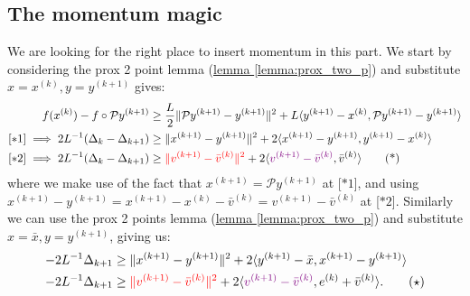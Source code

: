 \documentclass[]{article}
\theoremstyle{definition}
\begin{document}
    \subsection{The momentum magic}
        We are looking for the right place to insert momentum in this part. We start by considering the prox 2 point lemma (\hyperref[lemma:prox_two_p]{lemma \ref*{lemma:prox_two_p}}) and substitute $x = x^{(k)}, y = y^{(k + 1)}$ gives: 
        \begin{align*}
            f(x^{(k)}) - f\circ \mathcal Py^{(k + 1)}
            &\ge 
            \frac{L}{2}\Vert \mathcal Py^{(k + 1)} - y^{(k + 1)}\Vert^2 + 
            L \langle y^{(k + 1)} - x^{(k)}, \mathcal P y^{(k + 1)} - y^{(k + 1)}\rangle 
            \\
            [*1]\implies
            2L^{-1} (\Delta_k - \Delta_{k + 1}) 
            &\ge 
            \Vert x^{(k + 1)} - y^{(k + 1)}\Vert^2 + 
            2 \langle x^{(k + 1)} - y^{(k + 1)}, y^{(k + 1)} - x^{(k)}\rangle
            \\
            [*2]\implies
            2L^{-1} (\Delta_k - \Delta_{k + 1})  
            & \ge 
            \textcolor{red}
            {
                \Vert 
                    v^{(k + 1)} - \bar v^{(k)}
                \Vert^2
            }
             + 
            2\langle \textcolor{violet}{v^{(k + 1)} - \bar v^{(k)}}, \bar v^{(k)}\rangle
            \tag{*}
        \end{align*}
        where we make use of the fact that $x^{(k + 1)} = \mathcal P y^{(k + 1)}$ at [$*1$], and using $x^{(k + 1)} - y^{(k + 1)} = x^{(k + 1)} - x^{(k)} - \bar v^{(k)} = v^{(k + 1)} - \bar v^{(k)}$ at [$*2$]. Similarly we can use the prox 2 points lemma (\hyperref[lemma:prox_two_p]{lemma \ref*{lemma:prox_two_p}}) and substitute $x = \bar x, y = y^{(k + 1)}$, giving us: 
        \begin{align*}
            -2L^{-1}\Delta_{k + 1} 
            &\ge 
            \Vert x^{(k + 1)} - y^{(k + 1)}\Vert^2 + 2
            \langle y^{(k + 1)} - \bar x, x^{(k + 1)} - y^{(k + 1)}\rangle
            \\
            -2L^{-1}\Delta_{k + 1} 
            & \ge 
            \textcolor{red}
            {
                \Vert 
                    v^{(k + 1)} - \bar v^{(k)}
                \Vert^2
            } + 
            2\langle  
                \textcolor{violet}{v^{(k + 1)} - \bar v^{(k)}},
                e^{(k)} + \bar v^{(k)}
            \rangle.
            \tag{$\star$}
        \end{align*}
\end{document}

